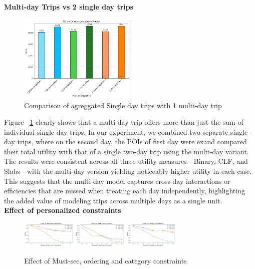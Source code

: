 \noindent\textbf{Multi-day Trips vs 2 single day trips}
\begin{figure}[H]
\centering
\includegraphics[width=0.5\textwidth]{plots/multivssingle.png}
\caption{Comparison of agreggated Single day trips with 1 multi-day trip}
\label{fig:singlevsmultiday}
\end{figure}
Figure ~\ref{fig:singlevsmultiday} clearly shows that a multi-day trip offers more than just the sum of individual single-day trips. In our experiment, we combined two separate single-day trips, where on the second day, the POIs of first day were exand compared their total utility with that of a single two-day trip using the multi-day variant. The results were consistent across all three utility measures—Binary, CLF, and Slabs—with the multi-day version yielding noticeably higher utility in each case. This suggests that the multi-day model captures cross-day interactions or efficiencies that are missed when treating each day independently, highlighting the added value of modeling trips across multiple days as a single unit.\\

\noindent\textbf{Effect of personalized constraints}
\begin{figure}[H]
\includegraphics[width=0.23\textwidth]{plots/mustsee.png}
\includegraphics[width=0.23\textwidth]{plots/ordering.png}
\centering
\includegraphics[width=0.23\textwidth]{plots/category.png}
\caption{Effect of Must-see, ordering and category constraints}
\label{fig:personalizedconstraints}
\end{figure}

